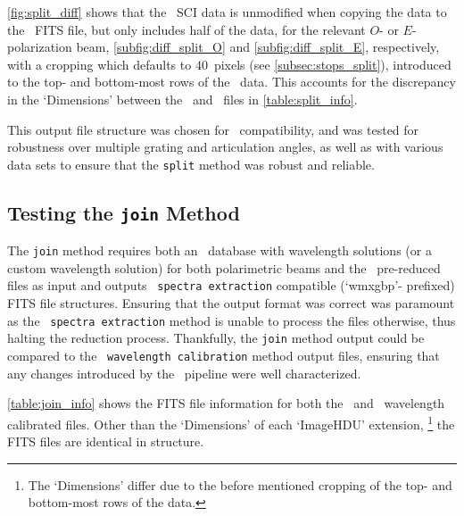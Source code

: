 \autoref{fig:split_diff} shows that the \polsalt\ \gls{SCI} data is unmodified when copying the data to the \stops\ \gls{FITS} file, but only includes half of the data, for the relevant $O$- or $E$-polarization beam, \autoref{subfig:diff_split_O} and \autoref{subfig:diff_split_E}, respectively, with a cropping which defaults to $40$~pixels (see \autoref{subsec:stops_split}), introduced to the top- and bottom-most rows of the \polsalt\ data. This accounts for the discrepancy in the `Dimensions' between the \polsalt\ and \stops\ files in \autoref{table:split_info}.

This output file structure was chosen for \iraf\ compatibility, and was tested for robustness over multiple grating and articulation angles, as well as with various data sets to ensure that the \texttt{split} method was robust and reliable.

\subsection{Testing the \texttt{join} Method} \label{subsec:test_join}

The \texttt{join} method requires both an \iraf\ database with wavelength solutions (or a custom wavelength solution) for both polarimetric beams and the \polsalt\ pre-reduced files as input and outputs \polsalt\ \texttt{spectra extraction} compatible (`wmxgbp'- prefixed) \gls{FITS} file structures. Ensuring that the output format was correct was paramount as the \polsalt\ \texttt{spectra extraction} method is unable to process the files otherwise, thus halting the reduction process. Thankfully, the \texttt{join} method output could be compared to the \polsalt\ \texttt{wavelength calibration} method output files, ensuring that any changes introduced by the \stops\ pipeline were well characterized.



\autoref{table:join_info} shows the \gls{FITS} file information for both the \polsalt\ and \stops\ wavelength calibrated files. Other than the `Dimensions' of each `ImageHDU' extension,%
\footnote{The `Dimensions' differ due to the before mentioned cropping of the top- and bottom-most rows of the data.}
the \gls{FITS} files are identical in structure.


